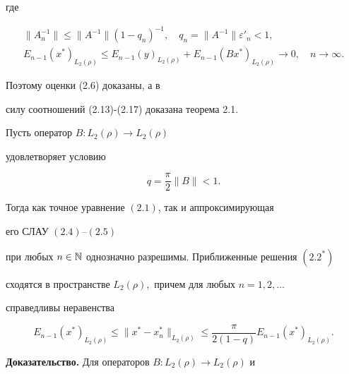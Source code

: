 где


\begin{gather}


\|A^{-1}_{n}\|\le\|A^{-1}\|(1-q_n)^{-1}, \quad


q_n=\|A^{-1}\|\varepsilon'_{n}<1, \\


%


E_{n-1}(x^{*})_{L_2(\rho)}\le E_{n-1}(y)_{L_2(\rho)}+E_{n-1}(Bx^*)_{L_2(\rho)}


\to 0, \quad n\to\infty.


\end{gather}


Поэтому оценки (2.6) доказаны, а в


силу соотношений (2.13)-(2.17) доказана теорема 2.1.





\begin{thms}


Пусть оператор $B:L_2(\rho)\to L_2(\rho)$


удовлетворяет условию


\begin{equation}


q=\frac{\pi}{2}\|B\|<1.


\end{equation}


Тогда как точное уравнение $(2.1)$, так и аппроксимирующая 


его СЛАУ $(2.4)$--$(2.5)$


при любых $n\in\Bbb N$ однозначно разрешимы. Приближенные решения $(2.2^*)$


сходятся в пространстве $L_2(\rho),$ причем для любых $n=1,2,\dotsc$


справедливы неравенства


\begin{equation}


E_{n-1}(x^*)_{L_2(\rho)}\le


\|x^*-x^*_n\|_{L_2(\rho)}\le\frac{\pi}{2(1-q)}E_{n-1}


(x^*)_{L_2(\rho)}.


\end{equation}


\end{thms}





{\bf Доказательство.} Для операторов $B:L_2(\rho)\to L_2(\rho)$ и


